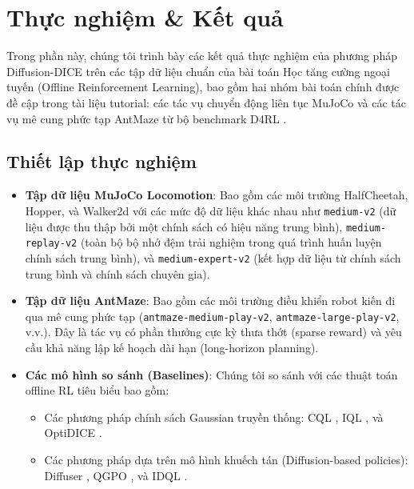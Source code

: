 \section{Thực nghiệm \& Kết quả}
\label{sec:experiments_results}

Trong phần này, chúng tôi trình bày các kết quả thực nghiệm của phương pháp Diffusion-DICE trên các tập dữ liệu chuẩn của bài toán Học tăng cường ngoại tuyến (Offline Reinforcement Learning), bao gồm hai nhóm bài toán chính được đề cập trong tài liệu tutorial: các tác vụ chuyển động liên tục MuJoCo và các tác vụ mê cung phức tạp AntMaze từ bộ benchmark D4RL \cite{fu2020d4rl}.

\subsection{Thiết lập thực nghiệm}
\begin{itemize}
    \item \textbf{Tập dữ liệu MuJoCo Locomotion}: Bao gồm các môi trường HalfCheetah, Hopper, và Walker2d với các mức độ dữ liệu khác nhau như \texttt{medium-v2} (dữ liệu được thu thập bởi một chính sách có hiệu năng trung bình), \texttt{medium-replay-v2} (toàn bộ bộ nhớ đệm trải nghiệm trong quá trình huấn luyện chính sách trung bình), và \texttt{medium-expert-v2} (kết hợp dữ liệu từ chính sách trung bình và chính sách chuyên gia).
    \item \textbf{Tập dữ liệu AntMaze}: Bao gồm các môi trường điều khiển robot kiến đi qua mê cung phức tạp (\texttt{antmaze-medium-play-v2}, \texttt{antmaze-large-play-v2}, v.v.). Đây là tác vụ có phần thưởng cực kỳ thưa thớt (sparse reward) và yêu cầu khả năng lập kế hoạch dài hạn (long-horizon planning).
    \item \textbf{Các mô hình so sánh (Baselines)}: Chúng tôi so sánh với các thuật toán offline RL tiêu biểu bao gồm:
    \begin{itemize}
        \item Các phương pháp chính sách Gaussian truyền thống: CQL \cite{kumar2020cql}, IQL \cite{kostrikov2021iql}, và OptiDICE \cite{lee2021optidice}.
        \item Các phương pháp dựa trên mô hình khuếch tán (Diffusion-based policies): Diffuser \cite{janner2022planning}, QGPO \cite{lu2023contrastive}, và IDQL \cite{hansen2023idql}.
    \end{itemize}
\end{itemize}

